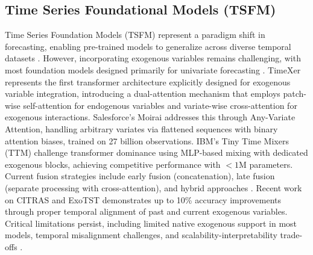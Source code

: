 \documentclass[conference]{IEEEtran}
\begin{document}
\subsection{Time Series Foundational Models (TSFM)}
Time Series Foundation Models (TSFM) represent a paradigm shift in forecasting, enabling pre-trained models to generalize across diverse temporal datasets \cite{Liang_Wen_Nie_Jiang_Jin_Song_Pan_Wen_2024}. However, incorporating exogenous variables remains challenging, with most foundation models designed primarily for univariate forecasting \cite{Liang_Wen_Nie_Jiang_Jin_Song_Pan_Wen_2024}. TimeXer~\cite{TimeXerNEURIPS2024} represents the first transformer architecture explicitly designed for exogenous variable integration, introducing a dual-attention mechanism that employs patch-wise self-attention for endogenous variables and variate-wise cross-attention for exogenous interactions. Salesforce's Moirai \cite{WOO_LIU_KUMAR_XIONG_SAVARESE_SAHOO_2024} addresses this through Any-Variate Attention, handling arbitrary variates via flattened sequences with binary attention biases, trained on 27 billion observations. IBM's Tiny Time Mixers (TTM) \cite{Ekambaram_Jati_Dayama_Mukherjee_Nguyen_Gifford_Reddy_Kalagnanam_2024} challenge transformer dominance using MLP-based mixing with dedicated exogenous blocks, achieving competitive performance with $<1$M parameters. Current fusion strategies include early fusion (concatenation), late fusion (separate processing with cross-attention), and hybrid approaches \cite{TimeXerNEURIPS2024, Ekambaram_Jati_Dayama_Mukherjee_Nguyen_Gifford_Reddy_Kalagnanam_2024}. Recent work on CITRAS \cite{Yamaguchi_Suemitsu_Wei_2025} and ExoTST \cite{Tayal_Renganathan_Jia_Kumar_Lu_2024} demonstrates up to 10\% accuracy improvements through proper temporal alignment of past and current exogenous variables. Critical limitations persist, including limited native exogenous support in most models, temporal misalignment challenges, and scalability-interpretability trade-offs \cite{Liang_Wen_Nie_Jiang_Jin_Song_Pan_Wen_2024}. 
\end{document}

